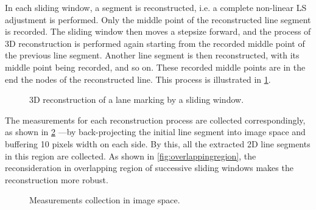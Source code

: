 In each sliding window, a segment is reconstructed, i.e. a complete non-linear LS adjustment is performed. Only the middle point of the reconstructed line segment is recorded. The sliding window then moves a stepsize forward, and the process of 3D reconstruction is performed again starting from the recorded middle point of the previous line segment. Another line segment is then reconstructed, with its middle point being recorded, and so on. These recorded middle points are in the end the nodes of the reconstructed line. This process is illustrated in \cref{fig:slidingwindow}.


\begin{figure}
	\centering
	
	
	
	\caption{\small 3D reconstruction of a lane marking by a sliding window.}
	\label{fig:slidingwindow}
\end{figure}


The measurements for each reconstruction process are collected correspondingly, as shown in \cref{fig:measurementscollection} ---by back-projecting the initial line segment into image space and buffering 10 pixels width on each side. By this, all the extracted 2D line segments in this region are collected. %
As shown in \cref{fig:overlappingregion}, the reconsideration in overlapping region of successive sliding windows makes the reconstruction more robust.

\begin{figure}
	\centering
	
	\caption{\small Measurements collection in image space.}
	\label{fig:measurementscollection}
\end{figure}



